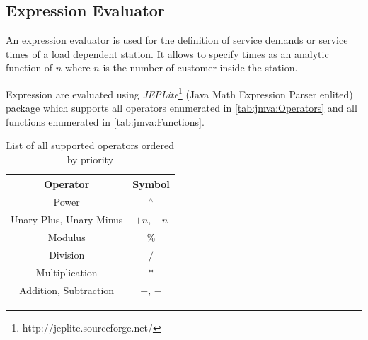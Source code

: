 \subsection{Expression Evaluator}
\label{sec:jmva:JEP} An expression evaluator is used for the
definition of service demands or service times of a load dependent
station. It allows to specify times as an analytic function of $n$
where $n$ is the number of customer inside the station.

Expression are evaluated using
\emph{JEPLite}\footnote{http://jeplite.sourceforge.net/} (Java Math
Expression Parser enlited) package which supports all operators
enumerated in \autoref{tab:jmva:Operators} and all functions
enumerated in \autoref{tab:jmva:Functions}.

\begin{table}[htbp]
\begin{center}
\begin{tabular}{|c|c|}
Operator & Symbol\\
\hline
Power & $^{\wedge}$\\
Unary Plus, Unary Minus & $+n$, $-n$\\
Modulus & $\%$\\
Division & $/$ \\
Multiplication & $*$\\
Addition, Subtraction & $+$, $-$\\
\hline
\end{tabular}
\end{center}
\caption{List of all supported operators ordered by priority}
\label{tab:jmva:Operators}
\end{table}

